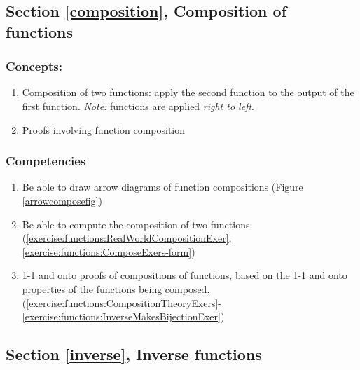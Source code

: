 \subsection*{Section \ref{composition}, Composition of functions}
\subsubsection*{Concepts:}
\begin{enumerate}
\item 
Composition of two functions: apply the second function to the output of the first function.  \emph{Note:} functions are applied \emph{right to left}.
\item
Proofs involving function composition
\end{enumerate}

\subsubsection*{Competencies}
\begin{enumerate}
\item
Be able to draw arrow diagrams of function compositions (Figure \ref{arrowcomposefig})
\item
Be able to compute the composition of two functions. (\ref{exercise:functions:RealWorldCompositionExer}, \ref{exercise:functions:ComposeExers-form})
\item
1-1 and onto proofs of compositions of functions, based on the 1-1 and onto properties of the functions being composed. (\ref{exercise:functions:CompositionTheoryExers}-\ref{exercise:functions:InverseMakesBijectionExer})
\end{enumerate}


\subsection*{Section \ref{inverse}, Inverse functions}
